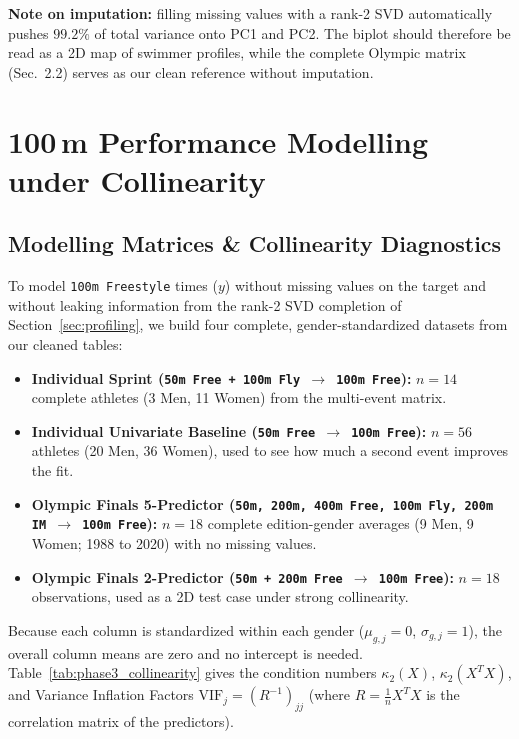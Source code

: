 \documentclass[11pt, a4paper]{article}
\begin{document}
\noindent \textbf{Note on imputation:} filling missing values with a rank-2 SVD automatically pushes $99.2\%$ of total variance onto PC1 and PC2. The biplot should therefore be read as a 2D map of swimmer profiles, while the complete Olympic matrix (Sec.~2.2) serves as our clean reference without imputation.

\section{\texorpdfstring{100\,m}{100m} Performance Modelling under Collinearity}
\label{sec:modelling}

\subsection{Modelling Matrices \texorpdfstring{\&}{and} Collinearity Diagnostics}

To model \texttt{100m Freestyle} times ($y$) without missing values on the target and without leaking information from the rank-2 SVD completion of Section~\ref{sec:profiling}, we build four complete, gender-standardized datasets from our cleaned tables:
\begin{itemize}
    \item \textbf{Individual Sprint (\texttt{50m Free + 100m Fly $\to$ 100m Free}):} $n=14$ complete athletes (3 Men, 11 Women) from the multi-event matrix.
    \item \textbf{Individual Univariate Baseline (\texttt{50m Free $\to$ 100m Free}):} $n=56$ athletes (20 Men, 36 Women), used to see how much a second event improves the fit.
    \item \textbf{Olympic Finals 5-Predictor (\texttt{50m, 200m, 400m Free, 100m Fly, 200m IM $\to$ 100m Free}):} $n=18$ complete edition-gender averages (9 Men, 9 Women; 1988 to 2020) with no missing values.
    \item \textbf{Olympic Finals 2-Predictor (\texttt{50m + 200m Free $\to$ 100m Free}):} $n=18$ observations, used as a 2D test case under strong collinearity.
\end{itemize}

\noindent Because each column is standardized within each gender ($\mu_{g,j}=0$, $\sigma_{g,j}=1$), the overall column means are zero and no intercept is needed. Table~\ref{tab:phase3_collinearity} gives the condition numbers $\kappa_2(X)$, $\kappa_2(X^T X)$, and Variance Inflation Factors $\text{VIF}_j = (R^{-1})_{jj}$ (where $R = \frac{1}{n}X^T X$ is the correlation matrix of the predictors).
\end{document}
